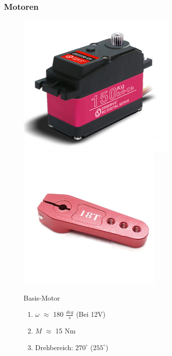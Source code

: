 \documentclass[aspectratio=169]{beamer}
\begin{document}
\begin{frame}[label = Motor1]
	\frametitle{Motoren}
	\begin{figure}[h]
		\begin{minipage}[c]{.46\linewidth}
			\centering
			\begin{overprint}
				 \includegraphics[height = 200pt]{../resources/BaseServo.png}
				\onslide<2> \includegraphics[height = 200pt]{../resources/BeefyServoArm.png}
			\end{overprint}
		\end{minipage}
		\hfill%
		\begin{minipage}[c]{.46\linewidth}
			\begin{block}{Basis-Motor}
				\begin{enumerate}
					\item $\omega$ $\approx$ 180 $\frac{deg}{s}$ (Bei 12$\si{\volt}$)
					\item $M$ $\approx$ 15 $\si{\newton}\si{\meter}$
					\item Drehbereich: $270^\circ$ ($255^\circ$)
				\end{enumerate}
			\end{block}
		\end{minipage}
	\end{figure}
\end{frame}
\end{document}
